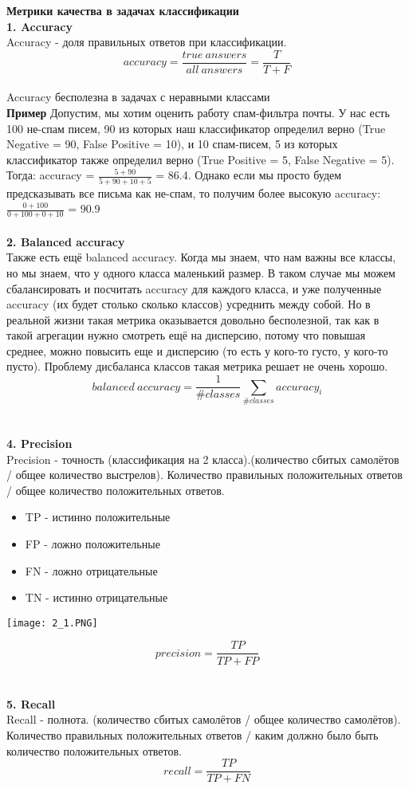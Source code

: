 \textbf{Метрики качества в задачах классификации}
\\
\textbf{1. Accuracy}\\
Accuracy - доля правильных ответов при классификации.
$$accuracy =\frac{true \ answers}{all \  answers} = \frac{T}{T + F}$$
\\
Accuracy бесполезна в задачах с неравными классами
\\

\textbf{Пример}
 Допустим, мы хотим оценить работу спам-фильтра почты. У нас есть 100 не-спам писем, 90 из которых наш
классификатор определил верно (True Negative = 90, False Positive = 10), и 10 спам-писем, 5 из которых классификатор
также определил верно (True Positive = 5, False Negative = 5). Тогда: accuracy =
$\frac{5+90}{5+90+10+5}$ = 86.4.
Однако если мы просто будем предсказывать все письма как не-спам, то получим более высокую accuracy: $\frac{0+100}{0+100+0+10}$ =
90.9
\\
\\
\textbf{2. Balanced accuracy} \\
Также есть ещё balanced accuracy. Когда мы знаем, что нам важны все классы, но мы знаем, что у одного
класса маленький размер. В таком случае мы можем сбалансировать и посчитать accuracy для каждого класса,
и уже полученные accuracy (их будет столько сколько классов) усреднить между собой. Но в реальной жизни
такая метрика оказывается довольно бесполезной, так как в такой агрегации нужно смотреть ещё на дисперсию, потому что повышая среднее, можно повысить еще и дисперсию (то есть у кого-то густо, у кого-то пусто).
Проблему дисбаланса классов такая метрика решает не очень хорошо.
$$balanced \ accuracy = \frac{1}{\#classes} \sum\limits_{\#classes} accuracy_i$$
\\
\\
 \textbf{4. Precision}\\
Precision - точность (классификация на 2 класса).(количество сбитых самолётов / общее количество выстрелов).
Количество правильных положительных ответов / общее количество положительных ответов.
\\
\begin{itemize}
    \item TP - истинно положительные
    \item FP - ложно положительные
    \item FN - ложно отрицательные
    \item TN - истинно отрицательные
\end{itemize}
\begin{center}
    \texttt{[image: 2\_1.PNG]}
\end{center}
$$precision = \frac{TP}{TP+FP}$$
\\
\\
  \textbf{5. Recall}
\\
Recall - полнота. (количество сбитых самолётов / общее количество самолётов). Количество правильных положительных ответов / каким должно было быть количество положительных ответов.
$$recall =\frac{TP}{TP + FN}$$

